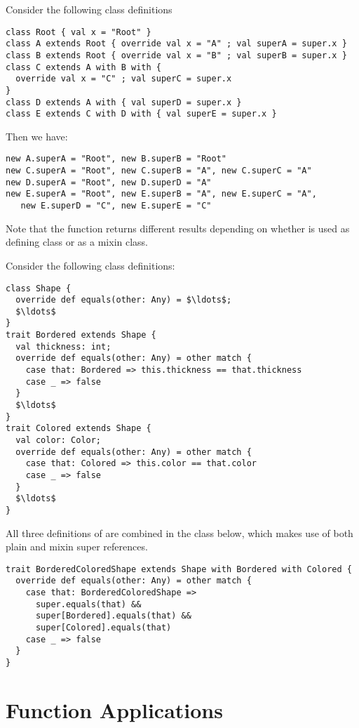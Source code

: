 \documentclass[a4paper,12pt,twoside,titlepage]{book}
\begin{document}
\example\label{ex:super}
Consider the following class definitions

\begin{lstlisting}
class Root { val x = "Root" }
class A extends Root { override val x = "A" ; val superA = super.x }
class B extends Root { override val x = "B" ; val superB = super.x }
class C extends A with B with { 
  override val x = "C" ; val superC = super.x 
}
class D extends A with { val superD = super.x }
class E extends C with D with { val superE = super.x }
\end{lstlisting}
Then we have:
\begin{lstlisting}
new A.superA = "Root", new B.superB = "Root"
new C.superA = "Root", new C.superB = "A", new C.superC = "A"
new D.superA = "Root", new D.superD = "A"
new E.superA = "Root", new E.superB = "A", new E.superC = "A",
   new E.superD = "C", new E.superE = "C"
\end{lstlisting}
Note that the  function returns different results
depending on whether  is used as defining class or as a mixin class.

\example Consider the following class definitions:
\begin{lstlisting}
class Shape {
  override def equals(other: Any) = $\ldots$;
  $\ldots$
}
trait Bordered extends Shape {
  val thickness: int;
  override def equals(other: Any) = other match {
    case that: Bordered => this.thickness == that.thickness
    case _ => false
  }
  $\ldots$
}
trait Colored extends Shape {
  val color: Color;
  override def equals(other: Any) = other match {
    case that: Colored => this.color == that.color
    case _ => false
  }
  $\ldots$
}
\end{lstlisting}

All three definitions of  are combined in the class
below, which makes use of both plain and mixin super references.
\begin{lstlisting}
trait BorderedColoredShape extends Shape with Bordered with Colored {
  override def equals(other: Any) = other match {
    case that: BorderedColoredShape => 
      super.equals(that) && 
      super[Bordered].equals(that) &&
      super[Colored].equals(that)
    case _ => false
  }
}
\end{lstlisting}

\section{Function Applications}
\label{sec:apply}
\end{document}
